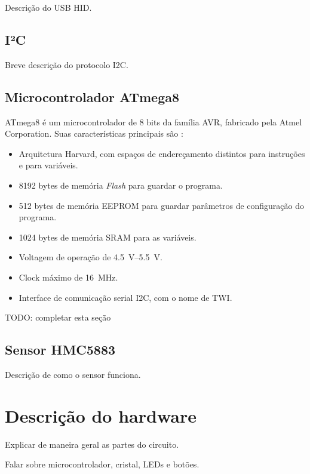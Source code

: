 \documentclass[brazil,pagestart=firstchapter]{abnt}
\begin{document}
Descrição do USB HID.

\section{I²C\label{sec:i2c}}

Breve descrição do protocolo \ac{I2C}.

\section{Microcontrolador ATmega8\label{sec:atmega8}}

ATmega8 é um microcontrolador de 8 bits da família AVR, fabricado pela Atmel
Corporation. Suas características principais são \cite{ATmega8}:

\begin{itemize}
\item Arquitetura Harvard, com espaços de endereçamento distintos para 
instruções e para variáveis.
\item \num{8192} bytes de memória \textit{Flash} para guardar o programa.
\item \num{512} bytes de memória \ac{EEPROM} para guardar parâmetros de configuração do
programa.
\item \num{1024} bytes de memória \ac{SRAM} para as variáveis.
\item Voltagem de operação de \SIrange{4.5}{5.5}{\volt}.
\item Clock máximo de \SI{16}{\mega\hertz}.
\item Interface de comunicação serial \ac{I2C}, com o nome de \ac{TWI}.
\end{itemize}

TODO: completar esta seção

\section{Sensor HMC5883\label{sec:sensor}}

Descrição de como o sensor funciona.


\chapter{Descrição do hardware\label{cap:hardware}}

Explicar de maneira geral as partes do circuito.

Falar sobre microcontrolador, cristal, LEDs e botões.
\end{document}
